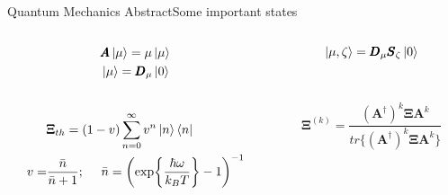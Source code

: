 \begin{frame}{Quantum Mechanics Abstract}{Some important states}
    \begin{columns}

        \begin{column}{0.5\textwidth}
            \begin{equation*}\begin{split}
                &\pmb{A}\ket{\mu}=\mu\ket{\mu}\\
                &\ket{\mu}=\pmb{D}_\mu\ket{0}
            \end{split}\end{equation*}
            \\ \mbox{}
            \begin{equation*}\begin{split}
                &\pmb{\Xi}_{th}=(1-v)\sum_{n=0}^{\infty}v^n\ket{n}\bra{n}\\
                v=&\frac{\bar{n}}{\bar{n}+1};\ \ \ \ 
                \bar{n}=\left(\exp{\frac{\hbar\omega}{k_B T}}-1\right)^{-1}
            \end{split}\end{equation*}
        \end{column}
        \begin{column}{0.5\textwidth}
            \begin{equation*}
                \ket{\mu,\zeta}=\pmb{D}_\mu\pmb{S}_\zeta\ket{0}
            \end{equation*}
            \\ \mbox{}
            \\
            \begin{equation*}
                \pmb{\Xi}^{(k)}=\frac{(\pmb{A}^\dagger)^k\pmb{\Xi}\pmb{A}^k}
                {tr\{(\pmb{A}^\dagger)^k\pmb{\Xi}\pmb{A}^k\}}
            \end{equation*}
            \mbox{}
            \mbox{}
        \end{column}
    \end{columns}

    \ \\ \mbox{} \\ \ \mbox{}
\end{frame}
